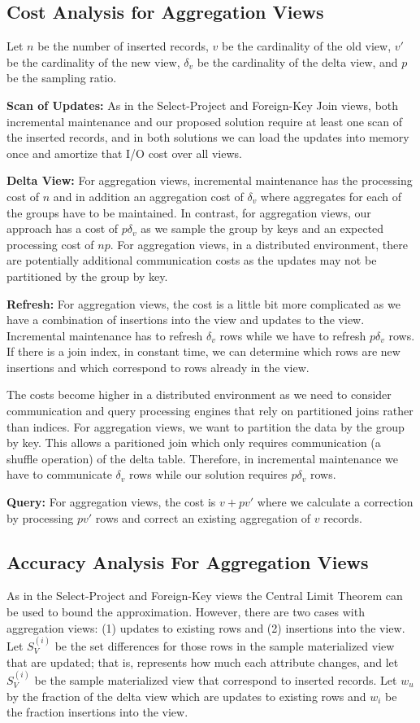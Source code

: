 \subsection{Cost Analysis for Aggregation Views}
Let $n$ be the number of inserted records, $v$ be the cardinality of the old view, $v'$ be the cardinality of the new view, $\delta_v$ be the cardinality of the delta view, and $p$ be the sampling ratio.  

\textbf{Scan of Updates: }
As in the Select-Project and Foreign-Key Join views, both incremental maintenance and our proposed solution require at least one scan of the inserted records, and in both solutions we can load the updates into memory once and amortize that I/O cost over all views. 

\textbf{Delta View: }  For aggregation views, incremental maintenance has the processing cost of $n$ and in addition an aggregation cost of $\delta_v$ where aggregates for each of the groups have to be maintained. In contrast, for aggregation views, our approach has a cost of $p\delta_v$ as we sample the group by keys and an expected processing cost of $np$. 
For aggregation views, in a distributed environment, there are potentially additional communication costs as the updates may not be partitioned by the group by key.

\textbf{Refresh: } For aggregation views, the cost is a little bit more complicated as we have a combination of insertions into the view and updates to the view. 
Incremental maintenance has to refresh $\delta_v$ rows while we have to refresh $p\delta_v$ rows. 
If there is a join index, in constant time, we can determine which rows are new insertions and which correspond to rows already in the view.

The costs become higher in a distributed environment as we need to consider communication and query processing engines that rely on partitioned joins rather than indices.
For aggregation views, we want to partition the data by the group by key.
This allows a paritioned join which only requires communication (a shuffle operation) of the delta table.
Therefore, in incremental maintenance we have to communicate $\delta_v$ rows while our solution requires $p\delta_v$ rows.

\textbf{Query: } For aggregation views, the cost is $v + pv'$ where we calculate a correction by processing $pv'$ rows and correct an existing aggregation of $v$ records.

\subsection{Accuracy Analysis For Aggregation Views}
As in the Select-Project and Foreign-Key views the Central Limit Theorem can
be used to bound the approximation.
However, there are two cases with aggregation views: (1) updates to existing rows and (2) insertions into the view.
Let $S_{V}^{(i)}$ be the set differences for those rows in the sample materialized view that are updated; that is, represents how much each attribute 
changes, and let $S_{V}^{(i)}$ be the sample materialized view that correspond to inserted records.
Let $w_u$ by the fraction of the delta view which are updates to existing rows and $w_i$ be the fraction insertions into the view.

